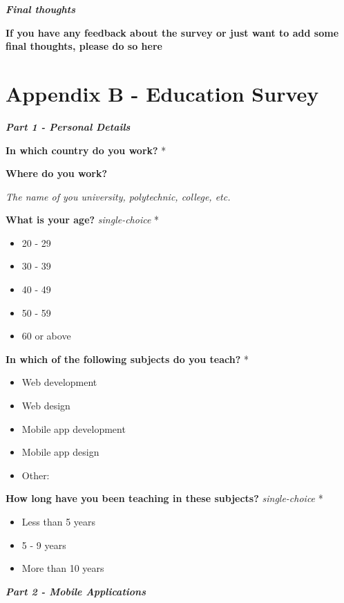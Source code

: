 \documentclass[a4paper,12pt]{article}
\begin{document}
\quad

\textbf{\textit{Final thoughts}}

\textbf{If you have any feedback about the survey or just want to add some final thoughts, please do so here}

\newpage
\section{Appendix B - Education Survey}
\label{Appendix_eduSurvey}

\textbf{\textit{Part 1 - Personal Details}}

\textbf{In which country do you work?} *

\quad

\textbf{Where do you work?}

\textit{The name of you university, polytechnic, college, etc.}

\quad

\textbf{What is your age?}  \textit{single-choice} *
\begin{itemize}
    \item 20 - 29
    \item 30 - 39
    \item 40 - 49
    \item 50 - 59
    \item 60 or above
\end{itemize}


\textbf{In which of the following subjects do you teach?} *
\begin{itemize}
    \item Web development
    \item Web design
    \item Mobile app development
    \item Mobile app design
    \item Other:
\end{itemize}

\textbf{How long have you been teaching in these subjects?} \textit{single-choice} *
\begin{itemize}
    \item Less than 5 years
    \item 5 - 9 years
    \item More than 10 years
\end{itemize}

\quad

\quad

\textbf{\textit{Part 2 - Mobile Applications}}
\end{document}
